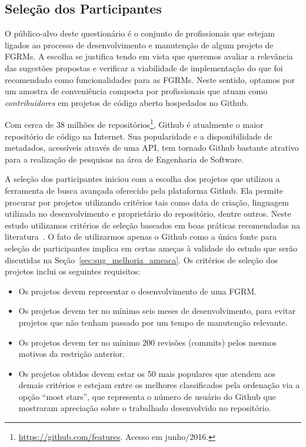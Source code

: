 \subsection{Seleção dos Participantes}
\label{ssub:sug_melhoria_selecao_participantes}

O público-alvo deste questionário é o conjunto de profissionais que estejam
ligados ao processo de desenvolvimento e manutenção de algum projeto de FGRMs.
A escolha se justifica tendo em vista que queremos avaliar a relevância das
sugestões propostas e verificar a viabilidade de implementação do que foi
recomendado como funcionalidades para as FGRMs. Neste sentido, optamos por um
amostra de conveniência composta por profissionais que atuam como
\textit{contribuidores} em projetos de código aberto hospedados no Github.

Com cerca de 38 milhões de
repositórios\footnote{\url{https://github.com/features}. Acesso em junho/2016.},
Github é atualmente o maior repositório de código na Internet. Sua popularidade
e a disponibilidade de metadados, acessíveis através de uma API, tem tornado
Github bastante atrativo para a realização de pesquisas na área de Engenharia de
Software.

A seleção dos participantes iniciou com a escolha dos projetos que utilizou a
ferramenta de busca avançada oferecido pela plataforma Github. Ela permite
procurar por projetos utilizando critérios tais como data de criação, linguagem
utilizada no desenvolvimento e proprietário do repositório, dentre outros. Neste
estudo utilizamos critérios de seleção baseados em boas práticas recomendadas na
literatura~\cite{Bird2009}. O fato de utilizarmos apenas o Github como a única
fonte para seleção de participantes implica em certas ameças à validade do
estudo que serão discutidas na Seção~\ref{sec:sug_melhoria_ameaca}. Os critérios
de seleção dos projetos inclui os seguintes requisitos:

\begin{itemize}
	\item Os projetos devem representar o desenvolvimento de uma FGRM\@.
    \item Os projetos devem ter no mínimo seis meses de desenvolvimento, para
        evitar projetos que não tenham passado por um tempo de manutenção
        relevante.
	\item Os projetos devem  ter  no  mínimo  200  revisões (commits)  pelos
		mesmos motivos  da restrição anterior.
    \item Os projetos obtidos devem estar os 50 mais populares que atendem aos
        demais critérios e estejam entre os melhores classificados pela
        ordenação via a opção ``most stars'', que representa o número de usuário
        do Github que mostraram apreciação sobre o trabalhado desenvolvido no
        repositório.
\end{itemize}

